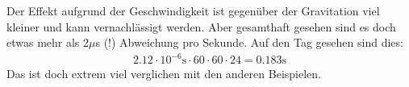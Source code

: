 \begin{refsection}
\noindent{}Der Effekt aufgrund der Geschwindigkeit ist gegenüber der Gravitation viel kleiner und kann vernachlässigt werden. Aber gesamthaft gesehen sind es doch etwas mehr als 2$\mu$s (!) Abweichung pro Sekunde. Auf den Tag gesehen sind dies:
\begin{align*}
2.12 \cdot 10^{-6}\text{s} \cdot 60 \cdot 60 \cdot 24 = 0.183\text{s}
\end{align*}
\noindent{}Das ist doch extrem viel verglichen mit den anderen Beispielen.

\printbibliography[heading=subbibliography]
\end{refsection}